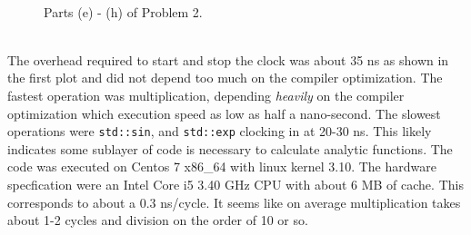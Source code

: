 \documentclass[singlepage,notitlepage,nofootinbib,12pt]{revtex4-1}
\begin{document}
\begin{figure}[h]
\ContinuedFloat
\centering
  \\
\caption{Parts (e) - (h) of Problem 2.}
\end{figure}\\
\indent The overhead required to start and stop the clock was about 35 ns as shown in the first plot and did not depend too much on the compiler optimization. The fastest operation was multiplication, depending {\it heavily} on the compiler optimization which execution speed as low as half a nano-second. The slowest operations were \verb|std::sin|, and \verb|std::exp| clocking in at 20-30 ns. This likely indicates some sublayer of code is necessary to calculate analytic functions. The code was executed on Centos 7 x86\_64 with linux kernel 3.10. The hardware specfication were an Intel Core i5  3.40 GHz CPU with about 6 MB of cache. This corresponds to about a 0.3 ns/cycle. It seems like on average multiplication takes about 1-2 cycles and division on the order of 10 or so.
\clearpage
\end{document}
